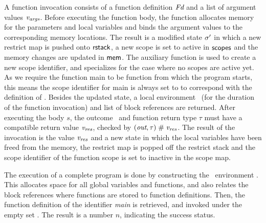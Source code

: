 A function invocation consists of a function definition $\textit{Fd}$ and a list of argument values $\textit{v}_{\textit{args}}$.
Before executing the function body, the function  allocates memory for the parameters and local variables
and binds the argument values to the corresponding memory locations.
The result is a modified state $\sigma'$ in which a new restrict map is pushed onto $\mathsf{rstack}$,
a new scope is set to active in $\mathsf{scopes}$ and the memory changes are updated in $\mathsf{mem}$.
The auxiliary function  is used to create a new scope identifier, and specializes for the
case where no scopes are active yet.
As we require the function main to be function from which the program starts, this means the scope identifier
for main is always set to  to correspond with the definition of .
Besides the updated state, a local environment \Envvar \ (for the duration of the function invocation)
and list of block references  are returned.
After executing the body $s$, the outcome \Outcomevar \ and function return type $\tau$ must have a compatible return value $\textit{v}_{\textit{res}}$,
checked by $(\textit{out}, \tau) \mathrel{\#} \textit{v}_{\textit{res}}$.
The result of the invocation is the value $\textit{v}_{\textit{res}}$ and a new state in which the local variables have been freed from the
memory, the restrict map is popped off the restrict stack and the scope identifier of the function scope is set to inactive in the scope map.

The execution of a complete program is done by constructing the \Globals \ environment \Globalsvar.
This allocates space for all global variables and functions, and also relates the block references where
functions are stored to function definitions. Then, the function definition of the identifier \textit{main} is retrieved,
and invoked under the empty set .
The result is a number $n$, indicating the success status.


